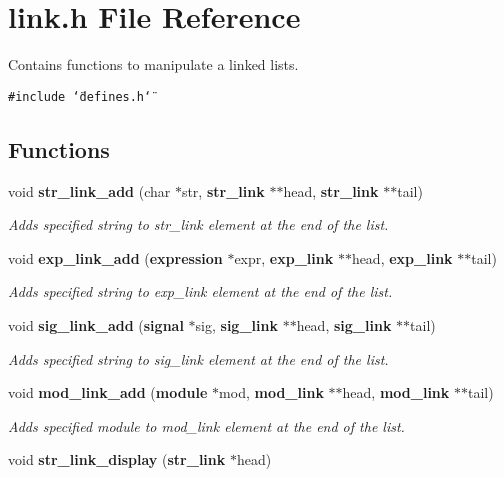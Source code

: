 \section{link.h File Reference}
\label{link_8h}
Contains functions to manipulate a linked lists. 


{\tt \#include \char`\"{}defines.h\char`\"{}}\par
\subsection*{Functions}
\begin{CompactItemize}
\item 
void {\bf str\_\-link\_\-add} (char $\ast$str, {\bf str\_\-link} $\ast$$\ast$head, {\bf str\_\-link} $\ast$$\ast$tail)
\begin{CompactList}\small\item\em Adds specified string to str\_\-link element at the end of the list.\item\end{CompactList}\item 
void {\bf exp\_\-link\_\-add} ({\bf expression} $\ast$expr, {\bf exp\_\-link} $\ast$$\ast$head, {\bf exp\_\-link} $\ast$$\ast$tail)
\begin{CompactList}\small\item\em Adds specified string to exp\_\-link element at the end of the list.\item\end{CompactList}\item 
void {\bf sig\_\-link\_\-add} ({\bf signal} $\ast$sig, {\bf sig\_\-link} $\ast$$\ast$head, {\bf sig\_\-link} $\ast$$\ast$tail)
\begin{CompactList}\small\item\em Adds specified string to sig\_\-link element at the end of the list.\item\end{CompactList}\item 
void {\bf mod\_\-link\_\-add} ({\bf module} $\ast$mod, {\bf mod\_\-link} $\ast$$\ast$head, {\bf mod\_\-link} $\ast$$\ast$tail)
\begin{CompactList}\small\item\em Adds specified module to mod\_\-link element at the end of the list.\item\end{CompactList}\item 
void {\bf str\_\-link\_\-display} ({\bf str\_\-link} $\ast$head)

\end{CompactItemize}
